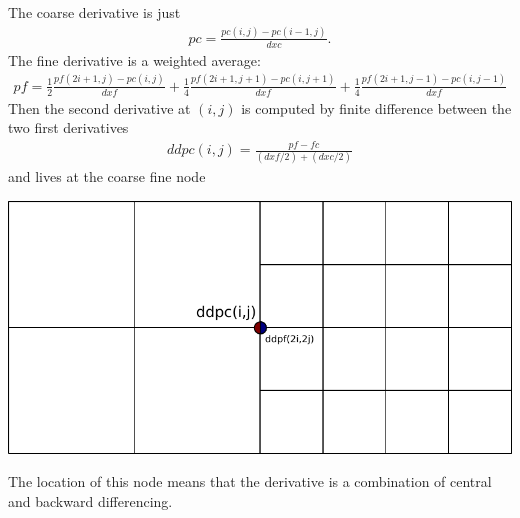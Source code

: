 \documentclass{article}
\begin{document}
The coarse derivative is just
\begin{align}
  pc = \frac{pc(i,j) - pc(i-1,j)}{dxc}.
\end{align}
The fine derivative is a weighted average:
\begin{align}
  pf = 
  \frac{1}{2}\frac{pf(2i+1,j) - pc(i,j)}{dxf}
  + \frac{1}{4}\frac{pf(2i+1,j+1) - pc(i,j+1)}{dxf}
  + \frac{1}{4}\frac{pf(2i+1,j-1) - pc(i,j-1)}{dxf}
\end{align}
Then the second derivative at $(i,j)$ is computed by finite difference between the two first derivatives
\begin{align}
  ddpc(i,j) = \frac{pf - fc}{(dxf/2) + (dxc/2)}
\end{align}
and lives at the coarse fine node
\begin{center}
  \includegraphics{stencil3}
\end{center}
The location of this node means that the derivative is a combination of central and backward differencing.
\end{document}
